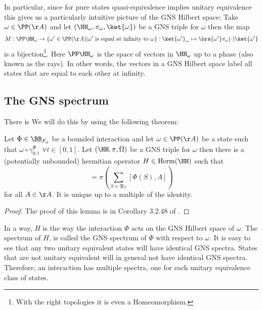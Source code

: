 In particular, since for pure states quasi-equivalence implies unitary equivalence this gives us a particularly intuitive picture of the GNS Hilbert space: Take $\omega\in\PP(\AA)$ and let $(\HH_\omega,\pi_\omega,\ket{\omega})$ be a GNS triple for $\omega$ then the map
\begin{equation}
M:\PP\HH_\omega\rightarrow \{\omega'\in\PP(\AA)|\omega'\text{ is equal at infinity to }\omega\}:\ket{\omega'}_\sim\mapsto \bra{\omega'}\pi_\omega(\cdot)\ket{\omega'}
\end{equation}
is a bijection\footnote{With the right topologies it is even a Homeomorphism.}. Here $\PP\HH_\omega$ is the space of vectors in $\HH_\omega$ up to a phase (also known as the rays). In other words, the vectors in a GNS Hilbert space label all states that are equal to each other at infinity.
\subsection{The GNS spectrum}\label{sec:GNS_Spectrum}
There is  We will do this by using the following theorem:
\begin{lemma}
	Let $\Phi\in\BB_{F_\phi}$ be a bounded interaction and let $\omega\in\PP(\AA)$ be a state such that $\omega\circ\gamma^{\Phi}_{0;t}$ $\forall t\in[0,1]$. Let $(\HH,\pi,\Omega)$ be a GNS triple for $\omega$ then there is a (potentially unbounded) hermitian operator $H\in\textrm{Herm}(\HH)$ such that
	\begin{equation}
		[H,\pi(A)]=\pi\left(\sum_{S\in\mathfrak{B}_\Gamma}[\Phi(S),A]\right)
	\end{equation}
	for all $A\in\AA$. It is unique up to a multiple of the identity.
\end{lemma}
\begin{proof}
	The proof of this lemma is in Corollary 3.2.48 of \cite{bratteli1979operator}.
\end{proof}
In a way, $H$ is the way the interaction $\Phi$ acts on the GNS Hilbert space of $\omega$. The spectrum of $H$, is called the GNS spectrum of $\Phi$ with respect to $\omega$. It is easy to see that any two unitary equivalent states will have identical GNS spectra. States that are not unitary equivalent will in general not have identical GNS spectra. Therefore, an interaction has multiple spectra, one for each unitary equivalence class of states.
